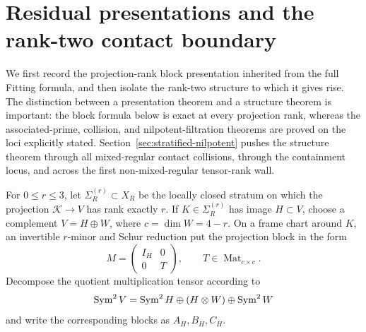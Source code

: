 \section{Residual presentations and the rank-two contact boundary}
\label{sec:ranktwo-boundary}

We first record the projection-rank block presentation inherited from
the full Fitting formula, and then isolate the rank-two structure to
which it gives rise.  The distinction between a presentation theorem
and a structure theorem is important: the block formula below is exact
at every projection rank, whereas the associated-prime, collision, and
nilpotent-filtration theorems are proved on the loci explicitly stated.
Section~\ref{sec:stratified-nilpotent} pushes the structure theorem
through all mixed-regular contact collisions, through the containment
locus, and across the first non-mixed-regular tensor-rank wall.

For $0\le r\le3$, let $\Sigma_R^{(r)}\subset X_R$ be the
locally closed stratum on which the projection $\mathcal K\to V$ has
rank exactly $r$.  If $K\in\Sigma_R^{(r)}$ has image $H\subset V$,
choose a complement $V=H\oplus W$, where $c=\dim W=4-r$.  On a frame
chart around $K$, an invertible $r$-minor and Schur reduction put the
projection block in the form
\[
 M=\begin{pmatrix}I_H&0\\0&T\end{pmatrix},
 \qquad T\in\operatorname{Mat}_{c\times c}.
\]
Decompose the quotient multiplication tensor according to
\[
 \operatorname{Sym}^2V=\operatorname{Sym}^2H\oplus(H\otimes W)\oplus\operatorname{Sym}^2W
\]
and write the corresponding blocks as $A_H,B_H,C_H$.

